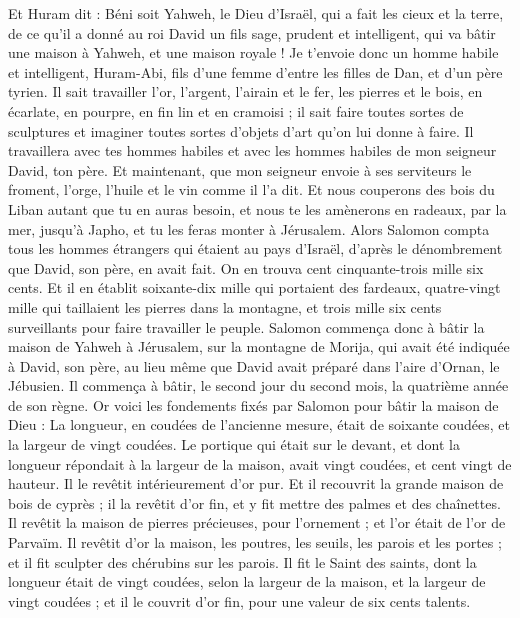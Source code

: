 \begin{multicols}{2}
Et Huram dit : Béni soit Yahweh, le Dieu d'Israël, qui a fait les cieux et la terre, de ce qu'il a donné au roi David un fils sage, prudent et intelligent, qui va bâtir une maison à Yahweh, et une maison royale !
Je t'envoie donc un homme habile et intelligent, Huram-Abi,
fils d'une femme d'entre les filles de Dan, et d'un père tyrien. Il sait travailler l'or, l'argent, l'airain et le fer, les pierres et le bois, en écarlate, en pourpre, en fin lin et en cramoisi ; il sait faire toutes sortes de sculptures et imaginer toutes sortes d'objets d'art qu'on lui donne à faire. Il travaillera avec tes hommes habiles et avec les hommes habiles de mon seigneur David, ton père.
Et maintenant, que mon seigneur envoie à ses serviteurs le froment, l'orge, l'huile et le vin comme il l'a dit.
Et nous couperons des bois du Liban autant que tu en auras besoin, et nous te les amènerons en radeaux, par la mer, jusqu'à Japho, et tu les feras monter à Jérusalem.
Alors Salomon compta tous les hommes étrangers qui étaient au pays d'Israël, d'après le dénombrement que David, son père, en avait fait. On en trouva cent cinquante-trois mille six cents.
Et il en établit soixante-dix mille qui portaient des fardeaux, quatre-vingt mille qui taillaient les pierres dans la montagne, et trois mille six cents surveillants pour faire travailler le peuple.
\VerseOne{}Salomon commença donc à bâtir la maison de Yahweh à Jérusalem, sur la montagne de Morija, qui avait été indiquée à David, son père, au lieu même que David avait préparé dans l'aire d'Ornan, le Jébusien.
Il commença à bâtir, le second jour du second mois, la quatrième année de son règne.
Or voici les fondements fixés par Salomon pour bâtir la maison de Dieu : La longueur, en coudées de l'ancienne mesure, était de soixante coudées, et la largeur de vingt coudées.
Le portique qui était sur le devant, et dont la longueur répondait à la largeur de la maison, avait vingt coudées, et cent vingt de hauteur. Il le revêtit intérieurement d'or pur.
Et il recouvrit la grande maison de bois de cyprès ; il la revêtit d'or fin, et y fit mettre des palmes et des chaînettes.
Il revêtit la maison de pierres précieuses, pour l'ornement ; et l'or était de l'or de Parvaïm.
Il revêtit d'or la maison, les poutres, les seuils, les parois et les portes ; et il fit sculpter des chérubins sur les parois.
Il fit le Saint des saints, dont la longueur était de vingt coudées, selon la largeur de la maison, et la largeur de vingt coudées ; et il le couvrit d'or fin, pour une valeur de six cents talents.

\end{multicols}
